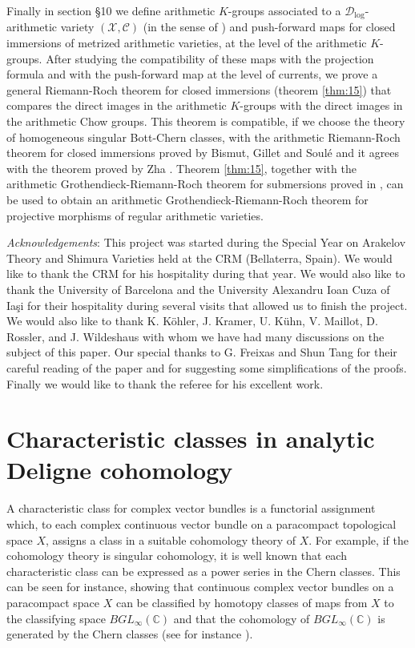 \documentclass[10pt,twoside]{article}
\numberwithin{equation}{section}
\theoremstyle{plain}
\theoremstyle{definition}
\begin{document}
Finally in section \S 10 we define arithmetic $K$-groups associated to 
a 
$\mathcal{D}_{\log}$-arithmetic variety $(\mathcal{X}, \mathcal{C})$
(in the sense of \cite{BurgosKramerKuehn:cacg}) and push-forward
maps for closed immersions of metrized arithmetic varieties, at the
level of the arithmetic $K$-groups. After studying the compatibility
of these maps with the projection formula and with the push-forward
map at the level of currents, we prove a general Riemann-Roch
theorem for closed immersions (theorem \ref{thm:15}) that compares
the direct images in the arithmetic $K$-groups with the direct
images in the arithmetic Chow groups. This theorem is compatible, if
we 
choose the theory of homogeneous singular Bott-Chern classes, with
the arithmetic Riemann-Roch theorem for closed immersions proved by
Bismut, Gillet and Soul\'e \cite{BismutGilletSoule:MR1086887} and it
agrees with the theorem proved by
Zha  \cite{zha99:_rieman_roch}. Theorem \ref{thm:15}, together with the
arithmetic Grothendieck-Riemann-Roch theorem for submersions 
proved in
\cite{GilletRoesslerSoule:_arith_rieman_roch_theor_in_higher_degrees},
can be used 
to obtain an arithmetic Grothendieck-Riemann-Roch theorem
for projective morphisms of regular arithmetic varieties.

\emph{Acknowledgements}: This project was started during the Special
Year on Arakelov Theory and Shimura Varieties held at the CRM
(Bellaterra, Spain). We would like to thank the CRM for his
hospitality during that year. We would also like to thank the
University of Barcelona and the University Alexandru Ioan Cuza of Ia\c si for
their hospitality during several visits that allowed us to finish the
project. We would also like to thank K. K\"ohler,
J. Kramer, U. K\"uhn, V. Maillot, D. Rossler, and J. Wildeshaus  with
whom we have had many discussions on the subject of this paper. Our
special thanks to G. Freixas and Shun Tang for their careful reading of
the paper and for suggesting some simplifications of the
proofs. Finally we would like to thank the referee for his excellent
work.      

\section{Characteristic classes in analytic Deligne cohomology}
\label{sec:char-class}

A characteristic class for complex vector bundles is a functorial
assignment which, to each 
complex continuous vector bundle on a paracompact topological space $X$,
assigns a class in a suitable cohomology theory of $X$. For example,
if the cohomology theory is
singular cohomology, it is 
well known that each characteristic class can be expressed as a power
series in the Chern classes. This can be seen for instance, showing
that continuous complex vector bundles on a paracompact space $X$ can
be classified by homotopy 
classes of maps from $X$ to the classifying space
$BGL_{\infty}(\mathbb{C})$ and that the cohomology of
$BGL_{\infty}(\mathbb{C})$ is generated by the Chern classes (see for
instance \cite{MilnorStasheff:cc}).
\end{document}
